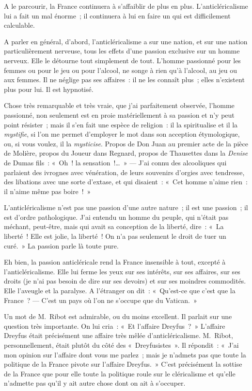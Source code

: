 \documentclass[french,twoside]{book} %
\begin{document}
\noindent A le parcourir, la France continuera à s’affaiblir de plus en plus. L’anticléricalisme lui a fait un mal énorme ; il continuera à lui en faire un qui est difficilement calculable.\par
A parler en général, d’abord, l’anticléricalisme a sur une nation, et sur une nation particulièrement nerveuse, tous les effets d’une passion exclusive sur un homme nerveux. Elle le détourne tout simplement de tout. L’homme passionné pour les femmes ou pour le jeu ou pour l’alcool, ne songe à rien qu’à l’alcool, au jeu ou aux femmes. Il ne néglige pas ses affaires : il ne les connaît plus ; elles n’existent plus pour lui. Il est hypnotisé.\par
Chose très remarquable et très vraie, que j’ai parfaitement observée, l’homme passionné, non seulement est en proie matériellement à sa passion et n’y peut point résister ; mais il s’en fait une espèce de religion : il la spiritualise et il la {\itshape mystifie}, si l’on me permet d’employer le mot dans son acception étymologique, ou, si vous voulez, il la {\itshape mysticise}. Propos de Don Juan au premier acte de la pièce de Molière, propos du Joueur dans Regnard, propos de Thausettes dans la \emph{Denise} de Dumas fils : « Oh ! la sensation !… » — J’ai connu  des alcooliques qui parlaient des ivrognes avec vénération, de leurs souvenirs d’orgies avec tendresse, des libations avec une sorte d’extase, et qui disaient : « Cet homme n’aime rien : il n’aime même pas boire ! »\par
L’anticléricalisme n’est pas une passion d’une autre nature ; il est une passion ; il est d’ordre pathologique. J’ai entendu un homme du peuple, qui n’était pas méchant, peut-être, mais qui avait sa conception de la liberté, dire : « La liberté ! Elle est jolie, la liberté ! On n’a pas seulement le droit de tuer un curé. » La passion parle là toute pure.\par
Eh bien, la passion anticléricale rend la France insensible à tout, excepté à l’anticléricalisme. Elle lui ferme les yeux sur ses intérêts, sur ses affaires, sur ses droits (je n’ai pas besoin de dire sur ses devoirs) et sur ses moindres commodités. Elle l’aveugle et la paralyse. A l’étranger on dit : « Qu’est-ce que c’est que la France ? — C’est un pays où l’on ne s’occupe que du Vatican. »\par
Un mot de M. Ribot est admirable, ou du moins excellent. Il parlait sur une question très importante. On lui cria : « Et l’affaire Dreyfus ? » L’affaire Dreyfus était précisément une affaire très mêlée d’anticléricalisme. M. Ribot, personnellement, était plutôt du côté des « Dreyfusistes ». Il  répondit : « J’ai mon opinion sur l’affaire dont vous me parlez ; mais je n’admets pas que toute la politique de la France pivote sur l’affaire Dreyfus. » C’est précisément la sottise de la France que pour elle toute la politique roule sur le cléricalisme et qu’elle n’admette pas qu’il y ait autre chose dont on ait à s’occuper.\par
\end{document}
